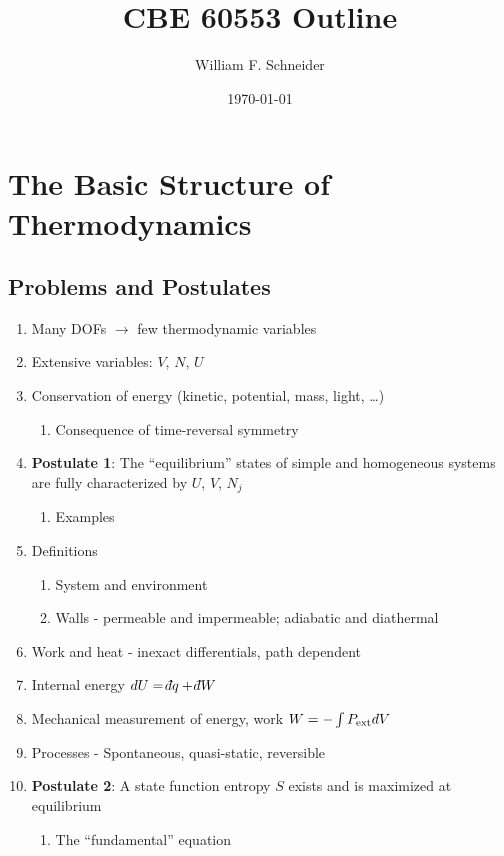 \documentclass[11pt]{article}
\author{William F. Schneider}
\date{\today}
\title{CBE 60553 Outline}
\def\dbar{{\mathchar'26\mkern-12mu d}}
\begin{document}
\begin{OPTIONS}
\end{OPTIONS}
\section{The Basic Structure of Thermodynamics}
\label{sec:orgdb4d970}
\subsection{Problems and Postulates}
\label{sec:orgbb437f1}
\begin{enumerate}
\item Many DOFs \(\rightarrow\) few thermodynamic variables
\item Extensive variables: \(V\), \(N\), \(U\)
\item Conservation of energy (kinetic, potential, mass, light, \ldots{})
\begin{enumerate}
\item Consequence of time-reversal symmetry
\end{enumerate}

\item \textbf{Postulate 1}: The ``equilibrium'' states of simple and homogeneous
systems are fully characterized by \(U\), \(V\), \(N_j\)
\begin{enumerate}
\item Examples
\end{enumerate}

\item Definitions
\begin{enumerate}
\item System and environment
\item Walls - permeable and impermeable; adiabatic and diathermal
\end{enumerate}

\item Work and heat - inexact differentials, path dependent

\item Internal energy \(dU = \dbar q + \dbar W\)

\item Mechanical measurement of energy, work \(W = - \int P_{\rm ext} dV\)

\item Processes - Spontaneous, quasi-static, reversible

\item \textbf{Postulate 2}: A state function entropy \(S\) exists and is maximized at equilibrium
\begin{enumerate}
\item The ``fundamental'' equation
\end{enumerate}


\end{enumerate}
\end{document}
